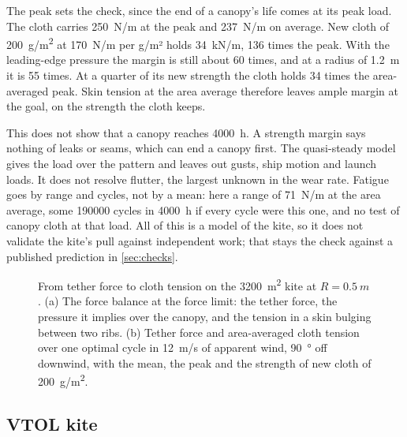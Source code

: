 The peak sets the check, since the end of a canopy's life comes at its peak load. The cloth carries \SI{250}{N/m} at the peak and \SI{237}{N/m} on average. New cloth of \SI{200}{g/m^2} at \SI{170}{N/m} per g/m² holds \SI{34}{kN/m}, 136 times the peak. With the leading-edge pressure the margin is still about 60 times, and at a radius of \SI{1.2}{m} it is 55 times. At a quarter of its new strength the cloth holds 34 times the area-averaged peak. Skin tension at the area average therefore leaves ample margin at the goal, on the strength the cloth keeps.

This does not show that a canopy reaches \SI{4000}{h}. A strength margin says nothing of leaks or seams, which can end a canopy first. The quasi-steady model gives the load over the pattern and leaves out gusts, ship motion and launch loads. It does not resolve flutter, the largest unknown in the wear rate. Fatigue goes by range and cycles, not by a mean: here a range of \SI{71}{N/m} at the area average, some \num{190000} cycles in \SI{4000}{h} if every cycle were this one, and no test of canopy cloth at that load. All of this is a model of the kite, so it does not validate the kite's pull against independent work; that stays the check against a published prediction in \cref{sec:checks}.

\begin{figure}[tbp]
\centering
{}
\caption{From tether force to cloth tension on the \SI{3200}{m^2} kite at $R=\SI{0.5}{m}$. (a) The force balance at the force limit: the tether force, the pressure it implies over the canopy, and the tension in a skin bulging between two ribs. (b) Tether force and area-averaged cloth tension over one optimal cycle in \SI{12}{m/s} of apparent wind, \SI{90}{\degree} off downwind, with the mean, the peak and the strength of new cloth of \SI{200}{g/m^2}.}
\label{fig:canopy_tension}
\end{figure}

\subsection{VTOL kite}
\label{sec:det_rigid}

